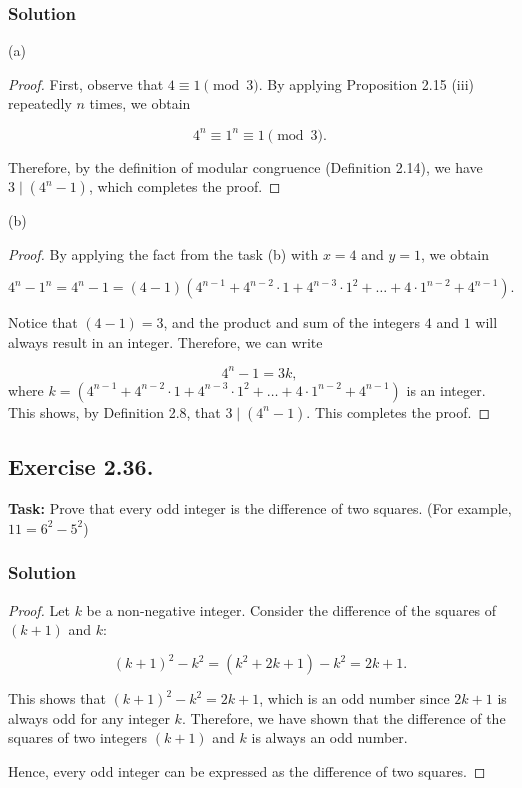 \documentclass{article}
\begin{document}
\subsubsection*{Solution}

(a)

\begin{proof}
    First, observe that $4 \equiv 1 \pmod{3}$. By applying Proposition 2.15 (iii) repeatedly $n$ times, we obtain

    \[4^n \equiv 1^n \equiv 1 \pmod{3}.\]

    Therefore, by the definition of modular congruence (Definition 2.14), we have $3 \mid (4^n - 1)$, which completes the proof.
\end{proof}

\noindent (b)

\begin{proof}
    By applying the fact from the task (b) with $x=4$ and $y=1$, we obtain

    \[
    4^n - 1^n = 4^n - 1 = (4 - 1)(4^{n-1} + 4^{n-2} \cdot 1 + 4^{n-3} \cdot 1^2 + \dots + 4 \cdot 1^{n-2} + 4^{n-1}).
    \]

    Notice that $(4 - 1) = 3$, and the product and sum of the integers $4$ and $1$ will always result in an integer. Therefore, we can write

    \[
    4^n - 1 = 3k,
    \]
    where $k = (4^{n-1} + 4^{n-2} \cdot 1 + 4^{n-3} \cdot 1^2 + \dots + 4 \cdot 1^{n-2} + 4^{n-1})$ is an integer. This shows, by Definition 2.8, that $3 \mid (4^n - 1)$. This completes the proof.
\end{proof}

\newpage

\subsection{Exercise 2.36.}
\textbf{Task:} Prove that every odd integer is the difference of two squares. (For example, $11 = 6^2 - 5^2$)

\subsubsection*{Solution}

\begin{proof}
    Let $k$ be a non-negative integer. Consider the difference of the squares of $(k+1)$ and $k$:

    \[
    (k+1)^2 - k^2 = (k^2 + 2k + 1) - k^2 = 2k + 1.
    \]

    This shows that $(k+1)^2 - k^2 = 2k + 1$, which is an odd number since $2k + 1$ is always odd for any integer $k$. Therefore, we have shown that the difference of the squares of two integers $(k+1)$ and $k$ is always an odd number. 

    Hence, every odd integer can be expressed as the difference of two squares.
\end{proof}
\end{document}
